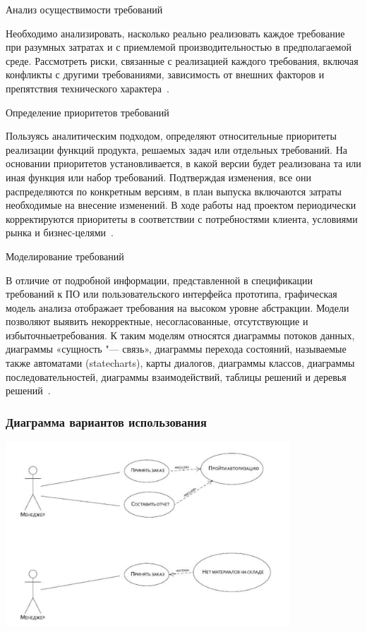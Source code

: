 \documentclass{../industrial-development}
\begin{document}
\lecturenotes

\alert{Анализ осуществимости требований}

Необходимо анализировать, насколько реально реализовать каждое требование при разумных затратах и с приемлемой производительностью в предполагаемой среде. Рассмотреть риски, связанные с реализацией каждого требования, включая конфликты с другими требованиями, зависимость от внешних факторов и препятствия технического характера~\cite[с.~48]{Wiegers}.

\alert{Определение приоритетов требований}

Пользуясь аналитическим подходом, определяют относительные приоритеты реализации функций продукта, решаемых задач или отдельных требований. На основании приоритетов установливается, в какой версии будет реализована та или иная функция или набор требований. Подтверждая изменения, все они распределяются по конкретным версиям, в план выпуска включаются затраты необходимые на внесение изменений. В ходе работы над проектом периодически корректируются приоритеты в соответствии с потребностями клиента, условиями рынка и бизнес-целями~\cite[с.~48-49]{Wiegers}.

\alert{Моделирование требований}

В отличие от подробной информации, представленной в спецификации требований к ПО или пользовательского интерфейса прототипа, графическая модель анализа отображает требования на высоком уровне абстракции. Модели позволяют выявить некорректные, несогласованные, отсутствующие и избыточныетребования. К таким моделям относятся диаграммы потоков данных, диаграммы «сущность "--- связь», диаграммы перехода состояний, называемые также автоматами (statecharts), карты диалогов, диаграммы классов, диаграммы последовательностей, диаграммы взаимодействий, таблицы решений и деревья решений~\cite[с.~49]{Wiegers}.


\begin{frame} \frametitle {Диаграмма вариантов использования}
 \centerline{\includegraphics[width=0.8\textwidth]{pict4.pdf}}
\end{frame}
\end{document}
